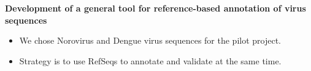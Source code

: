 \documentclass[landscape]{slides}
\begin{document}
\begin{slide}
\begin{center}
\vfill

\end{center}
\end{slide}
\begin{slide}
\begin{center}
\textbf{Development of a general tool for reference-based annotation
  of virus sequences}
\end{center}

\begin{itemize}
  \item We chose Norovirus and Dengue virus sequences for the pilot
    project.
  \item Strategy is to use RefSeqs to annotate and validate at the
    same time.
\end{itemize}

\end{slide}
\end{document}
